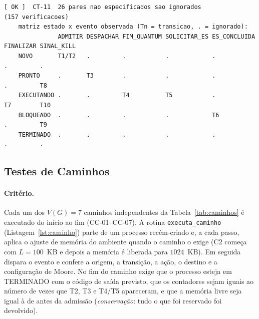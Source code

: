 \documentclass[11pt,a4paper]{article}
\theoremstyle{definition}
\newcommand{\est}[1]{\textsf{\small #1}}   %
\newcommand{\VG}{V(G)}
\begin{document}
\begin{lstlisting}[style=saida]
[ OK ]  CT-11  26 pares nao especificados sao ignorados                       (157 verificacoes)
    matriz estado x evento observada (Tn = transicao, . = ignorado):
               ADMITIR DESPACHAR FIM_QUANTUM SOLICITAR_ES ES_CONCLUIDA FINALIZAR SINAL_KILL
    NOVO       T1/T2   .         .           .            .            .         .         
    PRONTO     .       T3        .           .            .            .         T8        
    EXECUTANDO .       .         T4          T5           .            T7        T10       
    BLOQUEADO  .       .         .           .            T6           .         T9        
    TERMINADO  .       .         .           .            .            .         .         
\end{lstlisting}

\subsection{Testes de Caminhos}\label{sec:testes-caminhos}

\paragraph{Critério.} Cada um dos $\VG = 7$ caminhos independentes da Tabela~\ref{tab:caminhos} é
executado do início ao fim (CC-01--CC-07). A rotina \texttt{executa\_caminho}
(Listagem~\ref{lst:caminho}) parte de um processo recém-criado e, a cada passo, aplica o ajuste de
memória do ambiente quando o caminho o exige (C2 começa com $L = 100$~KB e depois a memória é
liberada para $1024$~KB). Em seguida dispara o evento e confere a origem, a transição, a ação, o
destino e a configuração de Moore. No fim do caminho exige que o processo esteja em
\est{TERMINADO} com o código de saída previsto, que os contadores sejam iguais ao número de vezes
que T2, T3 e T4/T5 apareceram, e que a memória livre seja igual à de antes da admissão
(\emph{conservação}: tudo o que foi reservado foi devolvido).


\end{document}
